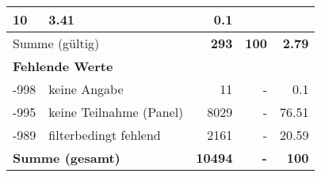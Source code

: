 \begin{longtable}{lXrrr}
       \num{10} &
       \num[round-mode=places,round-precision=2]{3,41} &
         \num[round-mode=places,round-precision=2]{0,1} \\
     \midrule
     \multicolumn{2}{l}{Summe (gültig)} &
       \textbf{\num{293}} &
     \textbf{100} &
       \textbf{\num[round-mode=places,round-precision=2]{2,79}} \\
     \multicolumn{5}{l}{\textbf{Fehlende Werte}}\\
       -998 &
       keine Angabe &
         \num{11} &
        - &
         \num[round-mode=places,round-precision=2]{0,1} \\
       -995 &
       keine Teilnahme (Panel) &
         \num{8029} &
        - &
         \num[round-mode=places,round-precision=2]{76,51} \\
       -989 &
       filterbedingt fehlend &
         \num{2161} &
        - &
         \num[round-mode=places,round-precision=2]{20,59} \\
     \midrule
     \multicolumn{2}{l}{\textbf{Summe (gesamt)}} &
          \textbf{\num{10494}} &
        \textbf{-} &
        \textbf{100} \\
     \bottomrule
     \end{longtable}
     
